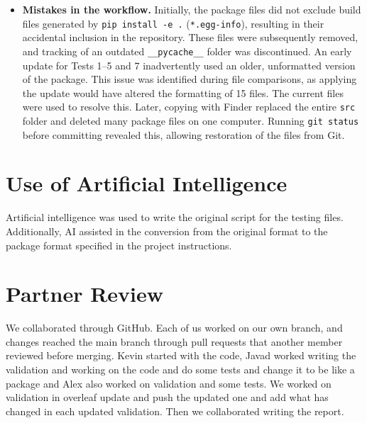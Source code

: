 \documentclass[11pt]{article}
\begin{document}
{\begin{itemize}
  of Alex's pull request, the multi-walker script failed at an import
  because the package had relocated \texttt{verify\_sho.py}. After updating the
  import and adding a fixed seed, the script executed successfully and produced
  results consistent with the exact values.
\item \textbf{Mistakes in the workflow.} Initially, the package files did not
  exclude build files generated by \texttt{pip install -e .}
  (\texttt{*.egg-info}), resulting in their accidental inclusion in the
  repository. These files were subsequently removed, and tracking of an
  outdated \texttt{\_\_pycache\_\_} folder was discontinued. An early update for
  Tests 1--5 and 7 inadvertently used an older, unformatted version of the
  package. This issue was identified during file
  comparisons, as applying the update would have altered the formatting of 15
  files. The current files were used to resolve this. Later, copying with
  Finder replaced the entire \texttt{src} folder and deleted many package files
  on one computer. Running \texttt{git status} before committing revealed this,
  allowing restoration of the files from Git.
\end{itemize}
\par}

\section{Use of Artificial Intelligence}

Artificial intelligence was used to write the original script for the testing files. Additionally, AI assisted in the conversion from the original format to the package format specified in the project instructions.


\section{Partner Review}\label{sec:review}

We collaborated through GitHub. Each of us worked on our own branch, and changes
reached the main branch through pull requests that another member reviewed before merging. Kevin started with the code, Javad worked writing the validation and working on the code and do some tests and change it to be like a package and Alex also worked on validation and some tests. We worked on validation in overleaf update and push the updated one and add what has changed in each updated validation. Then we collaborated writing the report.
\end{document}
